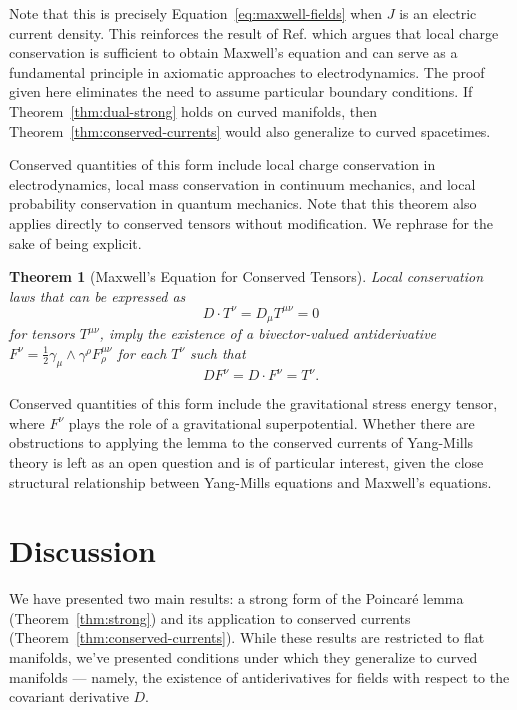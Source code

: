 \documentclass[twocolumn,notitlepage,nofootinbib,tightenlines]{revtex4-1}
\newtheorem{thm}{Theorem}[section]
\theoremstyle{definition}
\theoremstyle{remark}
\numberwithin{equation}{section}
\begin{document}
Note that this is precisely Equation~\ref{eq:maxwell-fields} when $J$ is an electric current density. This reinforces the result of Ref. \cite{heras} which argues that local charge conservation is sufficient to obtain Maxwell's equation and can serve as a fundamental principle in axiomatic approaches to electrodynamics. The proof given here eliminates the need to assume particular boundary conditions. If Theorem~\ref{thm:dual-strong} holds on curved manifolds, then Theorem~\ref{thm:conserved-currents} would also generalize to curved spacetimes.

Conserved quantities of this form include local charge conservation in electrodynamics, local mass conservation in continuum mechanics, and local probability conservation in quantum mechanics. Note that this theorem also applies directly to conserved tensors without modification. We rephrase for the sake of being explicit.

\begin{thm}[Maxwell's Equation for Conserved Tensors]\label{thm:conserved-tensors} Local conservation laws that can be expressed as
%
\begin{equation}
    D \cdot T^\nu = D_\mu T^{\mu \nu} = 0
\end{equation}
%
for tensors $T^{\mu\nu}$, imply the existence of a bivector-valued antiderivative $F^\nu = \frac{1}{2} \gamma_\mu \wedge \gamma^\rho F^{\mu \nu}_{\rho}$ for each $T^\nu$ such that
%
\begin{equation}
    D F^\nu = D \cdot F^\nu = T^\nu.
\end{equation}
\end{thm}

Conserved quantities of this form include the gravitational stress energy tensor, where $F^\nu$ plays the role of a gravitational superpotential. Whether there are obstructions to applying the lemma to the conserved currents of Yang-Mills theory is left as an open question and is of particular interest, given the close structural relationship between Yang-Mills equations and Maxwell's equations.

\section{Discussion}

We have presented two main results: a strong form of the Poincar\'e lemma (Theorem~\ref{thm:strong}) and its application to conserved currents (Theorem~\ref{thm:conserved-currents}). While these results are restricted to flat manifolds, we've presented conditions under which they generalize to curved manifolds --- namely, the existence of antiderivatives for fields with respect to the covariant derivative $D$.
\end{document}
